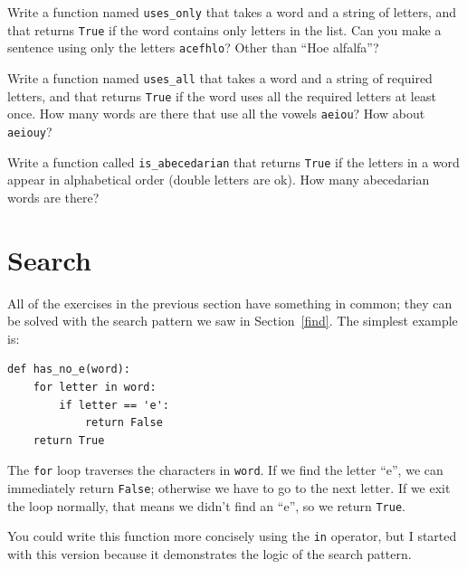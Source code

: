 \documentclass[10pt]{book}
\begin{document}
\begin{exercise}

Write a function named \verb"uses_only" that takes a word and a
string of letters, and that returns {\tt True} if the word contains
only letters in the list.  Can you make a sentence using only the
letters {\tt acefhlo}?  Other than ``Hoe alfalfa''?

\end{exercise}


\begin{exercise} 

Write a function named \verb"uses_all" that takes a word and a
string of required letters, and that returns {\tt True} if the word
uses all the required letters at least once.  How many words are there
that use all the vowels {\tt aeiou}?  How about {\tt aeiouy}?

\end{exercise}


\begin{exercise}

Write a function called \verb"is_abecedarian" that returns
{\tt True} if the letters in a word appear in alphabetical order
(double letters are ok).  
How many abecedarian words are there?


\end{exercise}



\section{Search}
\label{search}

All of the exercises in the previous section have something
in common; they can be solved with the search pattern we saw
in Section~\ref{find}.  The simplest example is:

\begin{verbatim}
def has_no_e(word):
    for letter in word:
        if letter == 'e':
            return False
    return True
\end{verbatim}
%
The {\tt for} loop traverses the characters in {\tt word}.  If we find
the letter ``e'', we can immediately return {\tt False}; otherwise we
have to go to the next letter.  If we exit the loop normally, that
means we didn't find an ``e'', so we return {\tt True}.

You could write this function more concisely using the {\tt in}
operator, but I started with this version because it 
demonstrates the logic of the search pattern.
\end{document}
